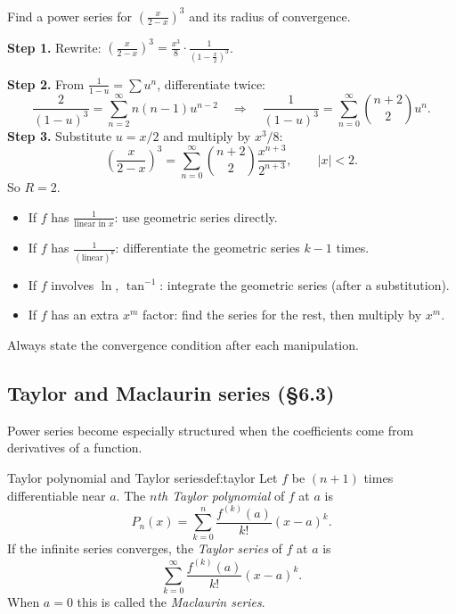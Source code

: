 \begin{examplebox}[title={Worked Example: differentiating twice (Tutorial~11, Q5(b))}]
Find a power series for $\displaystyle\left(\frac{x}{2-x}\right)^3$ and its radius of convergence.

\smallskip
\textbf{Step 1.} Rewrite: $\left(\frac{x}{2-x}\right)^3=\frac{x^3}{8}\cdot\frac{1}{\left(1-\frac{x}{2}\right)^3}$.

\textbf{Step 2.} From $\frac{1}{1-u}=\sum u^n$, differentiate twice:
\[
\frac{2}{(1-u)^3}=\sum_{n=2}^{\infty}n(n-1)u^{n-2}
\quad\Longrightarrow\quad
\frac{1}{(1-u)^3}=\sum_{n=0}^{\infty}\binom{n+2}{2}u^n.
\]
\textbf{Step 3.} Substitute $u=x/2$ and multiply by $x^3/8$:
\[
\left(\frac{x}{2-x}\right)^3
=\sum_{n=0}^{\infty}\binom{n+2}{2}\frac{x^{n+3}}{2^{n+3}},
\qquad |x|<2.
\]
So $R=2$.
\end{examplebox}

\begin{examtip}[title={Exam Focus: choosing the right manipulation}]
\begin{itemize}[leftmargin=*]
\item If $f$ has $\frac{1}{\text{linear in }x}$: use geometric series directly.
\item If $f$ has $\frac{1}{(\text{linear})^k}$: differentiate the geometric series $k-1$ times.
\item If $f$ involves $\ln$, $\tan^{-1}$: integrate the geometric series (after a substitution).
\item If $f$ has an extra $x^m$ factor: find the series for the rest, then multiply by $x^m$.
\end{itemize}
Always state the convergence condition after each manipulation.
\end{examtip}

\subsection{Taylor and Maclaurin series (\S6.3)}

Power series become especially structured when the coefficients come from derivatives of a function.

\begin{definition}{Taylor polynomial and Taylor series}{def:taylor}
Let $f$ be $(n+1)$ times differentiable near $a$. The \emph{$n$th Taylor polynomial} of $f$ at $a$ is
\[
P_n(x)=\sum_{k=0}^{n}\frac{f^{(k)}(a)}{k!}(x-a)^k.
\]
If the infinite series converges, the \emph{Taylor series} of $f$ at $a$ is
\[
\sum_{k=0}^{\infty}\frac{f^{(k)}(a)}{k!}(x-a)^k.
\]
When $a=0$ this is called the \emph{Maclaurin series}.
\end{definition}

